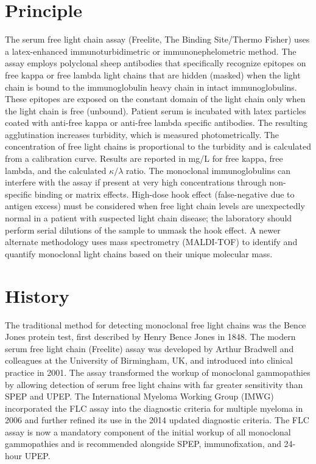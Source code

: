 \section*{Principle}
The serum free light chain assay (Freelite, The Binding Site/Thermo Fisher) uses a latex-enhanced immunoturbidimetric or immunonephelometric method. The assay employs polyclonal sheep antibodies that specifically recognize epitopes on free kappa or free lambda light chains that are hidden (masked) when the light chain is bound to the immunoglobulin heavy chain in intact immunoglobulins. These epitopes are exposed on the constant domain of the light chain only when the light chain is free (unbound). Patient serum is incubated with latex particles coated with anti-free kappa or anti-free lambda specific antibodies. The resulting agglutination increases turbidity, which is measured photometrically. The concentration of free light chains is proportional to the turbidity and is calculated from a calibration curve. Results are reported in mg/L for free kappa, free lambda, and the calculated $\kappa/\lambda$ ratio. The monoclonal immunoglobulins can interfere with the assay if present at very high concentrations through non-specific binding or matrix effects. High-dose hook effect (false-negative due to antigen excess) must be considered when free light chain levels are unexpectedly normal in a patient with suspected light chain disease; the laboratory should perform serial dilutions of the sample to unmask the hook effect. A newer alternate methodology uses mass spectrometry (MALDI-TOF) to identify and quantify monoclonal light chains based on their unique molecular mass.

\section*{History}
The traditional method for detecting monoclonal free light chains was the Bence Jones protein test, first described by Henry Bence Jones in 1848. The modern serum free light chain (Freelite) assay was developed by Arthur Bradwell and colleagues at the University of Birmingham, UK, and introduced into clinical practice in 2001. The assay transformed the workup of monoclonal gammopathies by allowing detection of serum free light chains with far greater sensitivity than SPEP and UPEP. The International Myeloma Working Group (IMWG) incorporated the FLC assay into the diagnostic criteria for multiple myeloma in 2006 and further refined its use in the 2014 updated diagnostic criteria. The FLC assay is now a mandatory component of the initial workup of all monoclonal gammopathies and is recommended alongside SPEP, immunofixation, and 24-hour UPEP.

